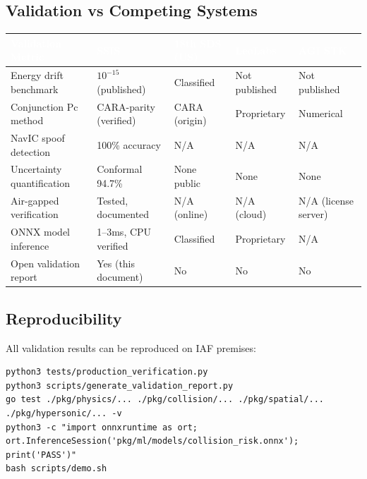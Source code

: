 \documentclass[11pt,a4paper]{article}
\newcommand{\TH}[1]{\textcolor{white}{\textbf{#1}}}
\begin{document}
\subsection{Validation vs Competing Systems}

\begin{table}[H]\centering\small
\begin{tabularx}{\textwidth}{|p{4cm}|p{2.8cm}|p{2.5cm}|p{2.2cm}|p{2.2cm}|}
\hline
\rowcolor{dblue}\TH{Validation Metric} & \TH{SSIS} & \TH{18th SDS (US)} & \TH{LeoLabs} & \TH{AGI STK} \\
\hline
Energy drift benchmark & $10^{-15}$ (published) & Classified & Not published & Not published \\
\hline
Conjunction Pc method & CARA-parity (verified) & CARA (origin) & Proprietary & Numerical \\
\hline
NavIC spoof detection & 100\% accuracy & N/A & N/A & N/A \\
\hline
Uncertainty quantification & Conformal 94.7\% & None public & None & None \\
\hline
Air-gapped verification & Tested, documented & N/A (online) & N/A (cloud) & N/A (license server) \\
\hline
ONNX model inference & 1--3ms, CPU verified & Classified & Proprietary & N/A \\
\hline
Open validation report & Yes (this document) & No & No & No \\
\hline
\end{tabularx}
\end{table}

\subsection{Reproducibility}
All validation results can be reproduced on IAF premises:
\begin{lstlisting}[breaklines=true]
python3 tests/production_verification.py
python3 scripts/generate_validation_report.py
go test ./pkg/physics/... ./pkg/collision/... ./pkg/spatial/... ./pkg/hypersonic/... -v
python3 -c "import onnxruntime as ort; ort.InferenceSession('pkg/ml/models/collision_risk.onnx'); print('PASS')"
bash scripts/demo.sh
\end{lstlisting}
\end{document}

